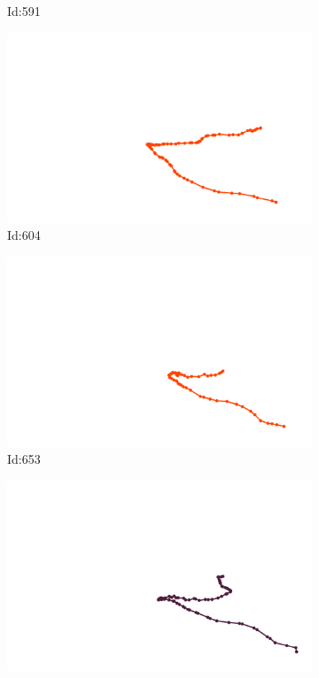 \documentclass[12pt,twoside]{report}
\begin{document}
\begin{figure}
\begin{subfigure}[b]{0.20\textwidth}
\caption{Id:591}
\end{subfigure}
\begin{subfigure}[b]{0.20\textwidth}
\centering
\includegraphics[width=\textwidth]{../trajectories/604.png}
\caption{Id:604}
\end{subfigure}
\begin{subfigure}[b]{0.20\textwidth}
\centering
\includegraphics[width=\textwidth]{../trajectories/653.png}
\caption{Id:653}
\end{subfigure}
\begin{subfigure}[b]{0.20\textwidth}
\centering
\includegraphics[width=\textwidth]{../trajectories/676.png}

\end{subfigure}
\end{figure}
\end{document}
